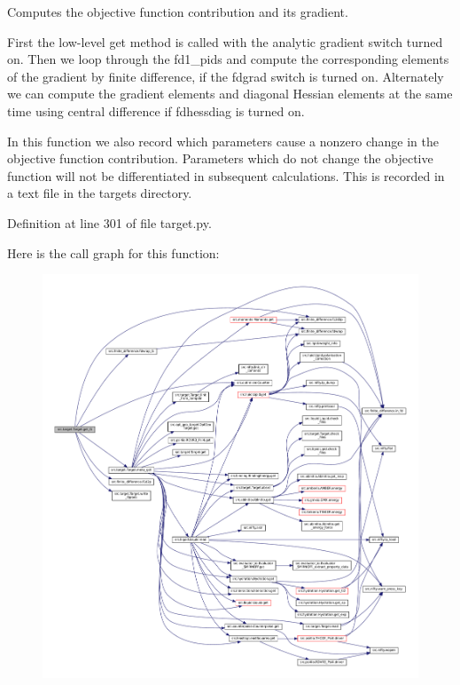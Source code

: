 Computes the objective function contribution and its gradient. 

First the low-\/level \textquotesingle{}get\textquotesingle{} method is called with the analytic gradient switch turned on. Then we loop through the fd1\+\_\+pids and compute the corresponding elements of the gradient by finite difference, if the \textquotesingle{}fdgrad\textquotesingle{} switch is turned on. Alternately we can compute the gradient elements and diagonal Hessian elements at the same time using central difference if \textquotesingle{}fdhessdiag\textquotesingle{} is turned on.

In this function we also record which parameters cause a nonzero change in the objective function contribution. Parameters which do not change the objective function will not be differentiated in subsequent calculations. This is recorded in a text file in the targets directory. 

Definition at line 301 of file target.\+py.

Here is the call graph for this function\+:
\nopagebreak
\begin{figure}[H]
\begin{center}
\leavevmode
\includegraphics[width=350pt]{classsrc_1_1target_1_1Target_abd888e5a08e9858fcf72dbad7133d538_cgraph}
\end{center}
\end{figure}
\mbox{\label{classsrc_1_1target_1_1Target_adae73b394ec5a1c22fe57d90265de537}} 
